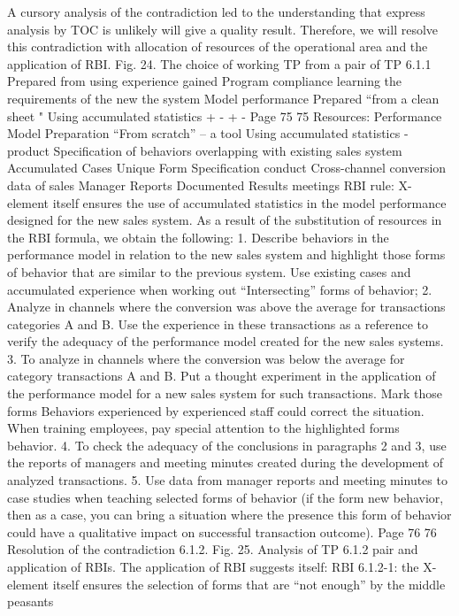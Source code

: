 A cursory analysis of the contradiction led to the understanding that express analysis by TOC is unlikely
will give a quality result. Therefore, we will resolve this contradiction with
allocation of resources of the operational area and the application of RBI.
Fig. 24. The choice of working TP from a pair of TP 6.1.1
Prepared from
using
experience gained
Program compliance
learning the requirements of the new
the system
Model
performance
Prepared “from a clean
sheet "
Using accumulated
statistics
+
-
+
-
Page 75
75
Resources:
Performance Model Preparation
“From scratch” -- a tool
Using accumulated statistics
- product
Specification of behaviors
overlapping with existing
sales system
Accumulated Cases
Unique Form Specification
conduct
Cross-channel conversion data
of sales
Manager Reports
Documented Results
meetings
RBI rule:
X-element itself ensures the use of accumulated statistics in the model
performance designed for the new sales system.
As a result of the substitution of resources in the RBI formula, we obtain the following:
1. Describe behaviors in the performance model in relation to the new
sales system and highlight those forms of behavior that are similar to the previous
system. Use existing cases and accumulated experience when working out
“Intersecting” forms of behavior;
2. Analyze in channels where the conversion was above the average for transactions
categories A and B. Use the experience in these transactions as a reference
to verify the adequacy of the performance model created for the new
sales systems.
3. To analyze in channels where the conversion was below the average for category transactions
A and B. Put a thought experiment in the application of the performance model for
a new sales system for such transactions. Mark those forms
Behaviors experienced by experienced staff could correct the situation.
When training employees, pay special attention to the highlighted forms
behavior.
4. To check the adequacy of the conclusions in paragraphs 2 and 3, use the reports of managers and
meeting minutes created during the development of analyzed transactions.
5. Use data from manager reports and meeting minutes to
case studies when teaching selected forms of behavior (if the form
new behavior, then as a case, you can bring a situation where the presence
this form of behavior could have a qualitative impact on successful
transaction outcome).
Page 76
76
Resolution of the contradiction 6.1.2.
Fig. 25. Analysis of TP 6.1.2 pair and application of RBIs.
The application of RBI suggests itself:
RBI 6.1.2-1: the X-element itself ensures the selection of forms that are “not enough” by the middle peasants
